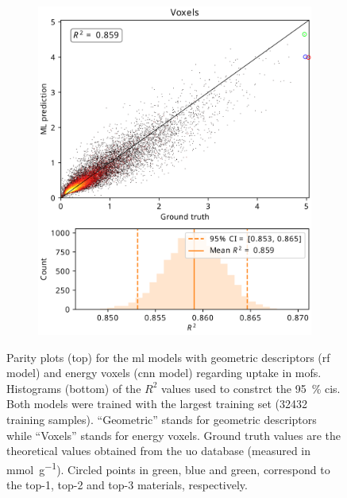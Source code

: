 \begin{figure}
\begin{subfigure}[b]{0.49\textwidth}
		\includegraphics[width=\textwidth]{fig/parity_voxels_mofs_annotated.png}
	\end{subfigure}
	\caption[Parity plots.]{Parity plots (top) for the
	\gls{ml} models with geometric descriptors (\gls{rf} model) and energy
	voxels (\gls{cnn} model) regarding  uptake in \glspl{mof}.
	Histograms (bottom) of the $R^2$ values used to constrct the
	\SI{95}{\percent} \glspl{ci}. Both models were trained with the largest
	training set (\num{32432} training samples).  ``Geometric'' stands for
	geometric descriptors while ``Voxels'' stands for energy voxels. Ground
	truth values are the theoretical values obtained from the \gls{uo} database
	(measured in \si{\milli\mole\per\gram}). Circled points in green, blue and
	green, correspond to the top-1, top-2 and top-3 materials, respectively.}
	\label{fig:parity_plots}
\end{figure}


